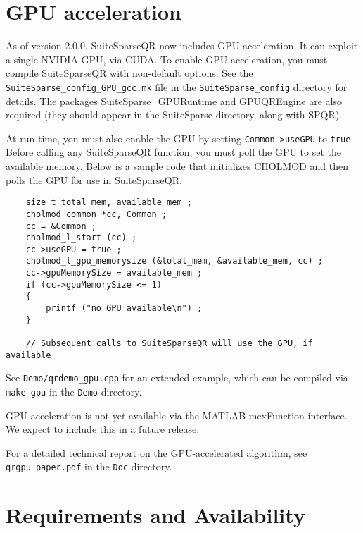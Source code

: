 \documentclass[12pt]{article}
\begin{document}
\section{GPU acceleration}
\label{GPU}

As of version 2.0.0, SuiteSparseQR now includes GPU acceleration.
It can exploit a single NVIDIA GPU, via CUDA.  To enable GPU acceleration,
you must compile SuiteSparseQR with non-default options.  See the
\verb'SuiteSparse_config_GPU_gcc.mk' file in the \verb'SuiteSparse_config'
directory for details.  The packages SuiteSparse\_GPURuntime and
GPUQREngine are also required (they should appear in the SuiteSparse 
directory, along with SPQR).

At run time, you must also enable the GPU by setting \verb'Common->useGPU'
to \verb'true'.  Before calling any SuiteSparseQR function, you must
poll the GPU to set the available memory.  Below is a sample code
that initializes CHOLMOD and then polls the GPU for use in SuiteSparseQR.

\begin{verbatim}
    size_t total_mem, available_mem ;
    cholmod_common *cc, Common ;
    cc = &Common ;
    cholmod_l_start (cc) ;
    cc->useGPU = true ;
    cholmod_l_gpu_memorysize (&total_mem, &available_mem, cc) ;
    cc->gpuMemorySize = available_mem ;
    if (cc->gpuMemorySize <= 1)
    {
        printf ("no GPU available\n") ;
    }

    // Subsequent calls to SuiteSparseQR will use the GPU, if available
\end{verbatim}

See \verb'Demo/qrdemo_gpu.cpp' for an extended example, which can be
compiled via \verb'make gpu' in the \verb'Demo' directory.

GPU acceleration is not yet available via the MATLAB mexFunction interface. 
We expect to include this in a future release.

For a detailed technical report on the GPU-accelerated algorithm,
see \verb'qrgpu_paper.pdf' in the \verb'Doc' directory.

\section{Requirements and Availability}
\label{summary}
\end{document}
